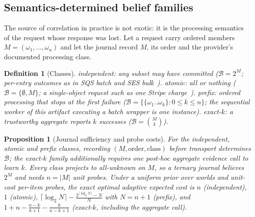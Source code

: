 \documentclass[conference,10pt]{IEEEtran}
\newtheorem{proposition}{Proposition}
\newtheorem{definition}{Definition}
\newcommand{\Bel}{\mathcal{B}}
\begin{document}
\subsection{Semantics-determined belief families}
The source of correlation in practice is not exotic: it is the processing semantics of the request whose response was lost. Let a request carry ordered members $M=(\omega_1,\dots,\omega_n)$ and let the journal record $M$, its order and the provider's documented processing class.
\begin{definition}[Classes]
\emph{independent}: any subset may have committed ($\Bel=2^{M}$; per-entry outcomes as in SQS batch and SES bulk~\cite{sqsbatch,ses}). \emph{atomic}: all or nothing ($\Bel=\{\emptyset,M\}$; a single-object request such as one Stripe charge~\cite{stripe}). \emph{prefix}: ordered processing that stops at the first failure ($\Bel=\{\{\omega_1..\omega_k\}:0\le k\le n\}$; the sequential worker of this artifact executing a batch wrapper is one instance). \emph{exact-$k$}: a trustworthy aggregate reports $k$ successes ($\Bel=\binom{M}{k}$).
\end{definition}
\begin{proposition}[Journal sufficiency and probe costs]\label{prop:classes}
For the independent, atomic and prefix classes, recording $(M,\text{order},\text{class})$ before transport determines $\Bel$; the exact-$k$ family additionally requires one post-hoc aggregate evidence call to learn $k$. Every class projects to all-unknown on $M$, so a ternary journal believes $2^{M}$ and needs $n=|M|$ unit probes. Under a uniform prior over worlds and unit-cost per-item probes, the exact optimal adaptive expected cost is $n$ (independent), $1$ (atomic), $\lceil\log_2 N\rceil-\frac{2^{\lceil\log_2 N\rceil}-N}{N}$ with $N=n{+}1$ (prefix), and $1+n-\frac{n-k}{k+1}-\frac{k}{n-k+1}$ (exact-$k$, including the aggregate call).
\end{proposition}
\end{document}
